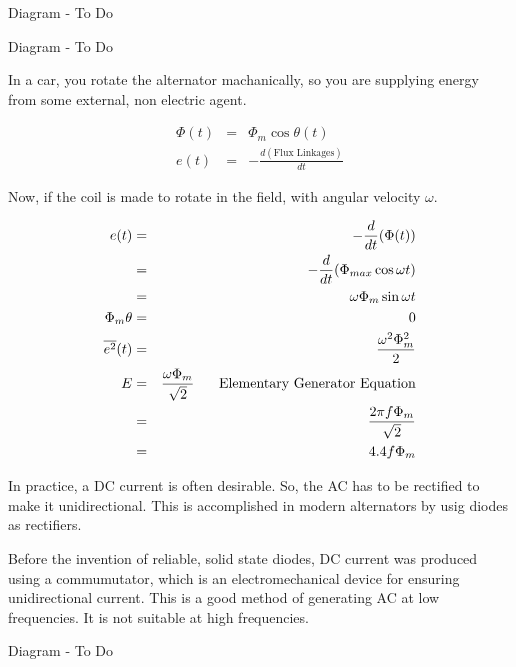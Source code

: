 \documentclass[a4paper,12pt]{article}
\begin{document}
\begin{table}[hbtp]

Diagram - To Do

\end{table}

\begin{table}[hbtp]

Diagram - To Do

\end{table}

In a car, you rotate the alternator machanically, so you are supplying
energy from some external, non electric agent.

\begin{eqnarray*}
\Phi(t) & = & \Phi_{m} \cos{\theta(t)} \\
e(t) & = & - \frac{d(\mbox{Flux Linkages})}{dt}
\end{eqnarray*}

Now, if the coil is made to rotate in the field, with angular velocity
$\omega$.

\begin{eqnarray*}
e(t) & = & - \frac{d}{dt} (\Phi (t)) \\
	  & = & - \frac{d}{dt} (\Phi_{max} \cos{\omega t}) \\
	  & = & \omega \Phi_{m} \sin{\omega t} \\
\Phi_{m} \theta & = & 0 \\
\overline{e^{2}}(t) & = & \frac{\omega^{2} \Phi_{m}^{2}}{2} \\
E & = & \frac{\omega \Phi_{m}}{\sqrt{2}} \mbox{\hspace{5mm} Elementary
Generator Equation} \\
  & = & \frac{2 \pi f \Phi_{m}}{\sqrt{2}} \\
  & = & 4.4 f \Phi_{m}
\end{eqnarray*}  

In practice, a DC current is often desirable. So, the AC has to be
rectified to make it unidirectional. This is accomplished in modern
alternators by usig diodes as rectifiers.

Before the invention of reliable, solid state diodes, DC current was
produced using a commumutator, which is an electromechanical device for
ensuring unidirectional current. This is a good method of generating AC 
at low frequencies. It is not suitable at high frequencies.

\begin{table}[hbtp]

Diagram - To Do

\end{table}
\end{document}
